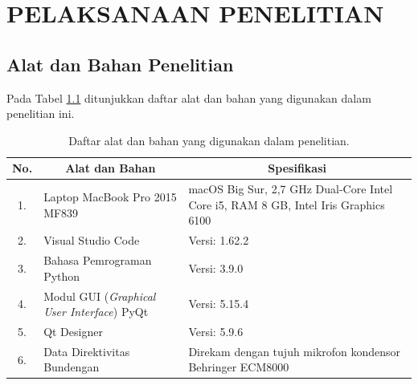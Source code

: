 \chapter{PELAKSANAAN PENELITIAN}\label{pelaksanaan-penelitian}

\section{Alat dan Bahan Penelitian}
Pada Tabel \ref{tab:alat-bahan} ditunjukkan daftar alat dan bahan yang digunakan dalam penelitian ini. \par 
\begin{table}[h!]
    \centering
    \caption{Daftar alat dan bahan yang digunakan dalam penelitian.}
    \begin{tabular}{cp{5cm}p{6cm}}
        \hline
        No. & \multicolumn{1}{c}{Alat dan Bahan}                 & \multicolumn{1}{c}{Spesifikasi}\\
        \hline
        1.  & Laptop MacBook Pro 2015 MF839                      & macOS Big Sur, 2,7 GHz Dual-Core Intel Core i5, RAM 8 GB, Intel Iris Graphics 6100\\
        \hline
        2.  & Visual Studio Code                                 & Versi: 1.62.2\\
        \hline
        3.  & Bahasa Pemrograman Python                          & Versi: 3.9.0\\
        \hline
        4.  & Modul GUI (\textit{Graphical User Interface}) PyQt & Versi: 5.15.4\\
        \hline
        5.  & Qt Designer                                        & Versi: 5.9.6\\
        \hline
        6.  & Data Direktivitas Bundengan                        & Direkam dengan tujuh mikrofon kondensor Behringer ECM8000 \cite{prosidingDirektivitas}\\
        \hline  
    \end{tabular}
    \label{tab:alat-bahan}
\end{table}

